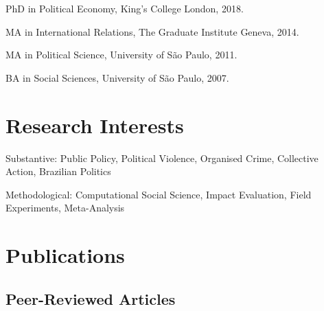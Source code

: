 \documentclass[a4paper]{article}
\renewenvironment{itemize}{
	\begin{list}{}{
			\setlength{\leftmargin}{1.5em}
		}
		}{
	\end{list}
}
\begin{document}
\begin{itemize}
\item PhD in Political Economy, King's College London, 2018.
\item MA in International Relations, The Graduate Institute Geneva, 2014.
\item MA in Political Science, University of São Paulo, 2011.
\item BA in Social Sciences, University of São Paulo, 2007.
\end{itemize}

\section*{Research Interests}

\begin{itemize}
\item Substantive: Public Policy, Political Violence, Organised Crime, Collective Action, Brazilian Politics
\item Methodological: Computational Social Science, Impact Evaluation, Field Experiments, Meta-Analysis
\end{itemize}

\section*{Publications}

\subsection*{Peer-Reviewed Articles}
\end{document}
